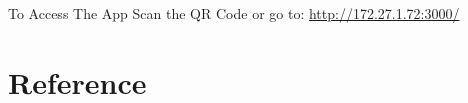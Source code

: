 \documentclass[a4paper,12pt]{article}
\begin{document}
\begin{myremark}{To Access The App}
\vspace{10px}
Scan the QR Code or go to: \href{http://172.27.1.72:3000/}{http://172.27.1.72:3000/}

\vspace{20px}

\quad
{}
\end{myremark}

\newpage
\section{Reference}
\printbibliography[title={References}]
\end{document}
